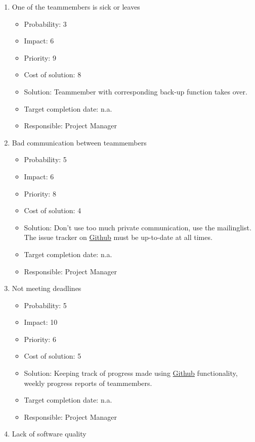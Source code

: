 \documentclass[9pt]{article}
\begin{document}
\begin{enumerate}
\def\labelenumi{\arabic{enumi}.}
\itemsep1pt\parskip0pt
\item
  One of the teammembers is sick or leaves

  \begin{itemize}
  \itemsep1pt\parskip0pt
  \item
    Probability: 3
  \item
    Impact: 6
  \item
    Priority: 9
  \item
    Cost of solution: 8
  \item
    Solution: Teammember with corresponding back-up function takes over.
  \item
    Target completion date: n.a.
  \item
    Responsible: Project Manager
  \end{itemize}
\item
  Bad communication between teammembers

  \begin{itemize}
  \itemsep1pt\parskip0pt
  \item
    Probability: 5
  \item
    Impact: 6
  \item
    Priority: 8
  \item
    Cost of solution: 4
  \item
    Solution: Don't use too much private communication, use the
    mailinglist. The issue tracker on \hyperref[Github]{Github} must be
    up-to-date at all times.
  \item
    Target completion date: n.a.
  \item
    Responsible: Project Manager
  \end{itemize}
\item
  Not meeting deadlines

  \begin{itemize}
  \itemsep1pt\parskip0pt
  \item
    Probability: 5
  \item
    Impact: 10
  \item
    Priority: 6
  \item
    Cost of solution: 5
  \item
    Solution: Keeping track of progress made using
    \hyperref[Github]{Github} functionality, weekly progress reports of
    teammembers.
  \item
    Target completion date: n.a.
  \item
    Responsible: Project Manager
  \end{itemize}
\item
  Lack of software quality


\end{enumerate}
\end{document}
